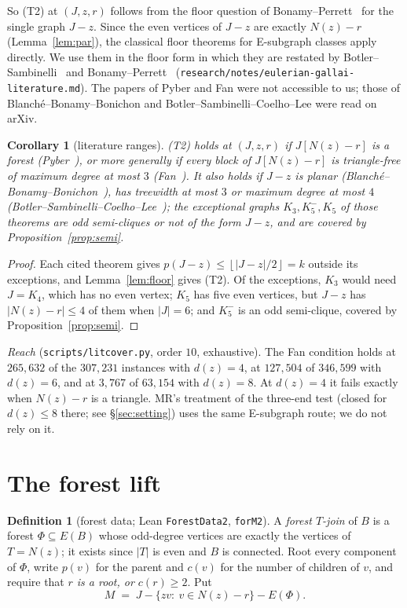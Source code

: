 \documentclass[11pt]{amsart}
\newtheorem{corollary}[theorem]{Corollary}
\theoremstyle{definition}
\newtheorem{definition}[theorem]{Definition}
\theoremstyle{remark}
\renewcommand{\_}{\oldunderscore\allowbreak}
\newcommand{\fl}[1]{\left\lfloor #1\right\rfloor}
\begin{document}
So (T2) at $(J,z,r)$ follows from the floor question of Bonamy--Perrett~\cite[Question~1.1]{BP}
for the single graph $J-z$. Since the even vertices of $J-z$ are exactly $N(z)-r$ (Lemma~\ref{lem:par}), the classical
floor theorems for E-subgraph classes apply directly. We use them in the floor form in which they
are restated by Botler--Sambinelli~\cite{BS} and Bonamy--Perrett~\cite{BP}
(\texttt{research/notes/eulerian-gallai-literature.md}). The papers of Pyber and Fan were not
accessible to us; those of Blanch\'e--Bonamy--Bonichon and Botler--Sambinelli--Coelho--Lee were read on
arXiv.

\begin{corollary}[literature ranges]\label{cor:lit}
(T2) holds at $(J,z,r)$ if $J[N(z)-r]$ is a forest (Pyber~\cite{Pyb96}), or more generally if every
block of $J[N(z)-r]$ is triangle-free of maximum degree at most $3$ (Fan~\cite{Fan05}). It also holds
if $J-z$ is planar (Blanch\'e--Bonamy--Bonichon~\cite{BBB}), has treewidth at most $3$ or maximum degree at most
$4$ (Botler--Sambinelli--Coelho--Lee~\cite{BSCL}); the exceptional graphs $K_3,K_5^-,K_5$ of those theorems are odd
semi-cliques or not of the form $J-z$, and are covered by Proposition~\ref{prop:semi}.
\end{corollary}

\begin{proof}
Each cited theorem gives $p(J-z)\le\fl{|J-z|/2}=k$ outside its exceptions, and Lemma~\ref{lem:floor}
gives (T2). Of the exceptions, $K_3$ would need $J=K_4$, which has no even vertex; $K_5$ has five
even vertices, but $J-z$ has $|N(z)-r|\le4$ of them when $|J|=6$; and $K_5^-$ is an odd semi-clique,
covered by Proposition~\ref{prop:semi}.
\end{proof}

\emph{Reach} (\texttt{scripts/lit\_cover.py}, order $10$, exhaustive). The Fan condition holds at
$265{,}632$ of the $307{,}231$ instances with $d(z)=4$, at $127{,}504$ of $346{,}599$ with $d(z)=6$, and at
$3{,}767$ of $63{,}154$ with $d(z)=8$. At $d(z)=4$ it fails exactly when $N(z)-r$ is a triangle.
MR's treatment of the three-end test (closed for $d(z)\le8$ there; see \S\ref{sec:setting}) uses
the same E-subgraph route; we do not rely on it.

\section{The forest lift}\label{sec:lift}

\begin{definition}[forest data; Lean \texttt{ForestData2}, \texttt{forM2}]\label{def:data}
A \emph{forest $T$-join} of $B$ is a forest $\Phi\subseteq E(B)$ whose odd-degree vertices are
exactly the vertices of $T=N(z)$; it exists since $|T|$ is even and $B$ is connected. Root every
component of $\Phi$, write $p(v)$ for the parent and $c(v)$ for the number of children of $v$, and
require that \emph{$r$ is a root, or $c(r)\ge2$}. Put
\[
M \;=\; J-\{zv:\ v\in N(z)-r\}-E(\Phi).
\]
\end{definition}
\end{document}
